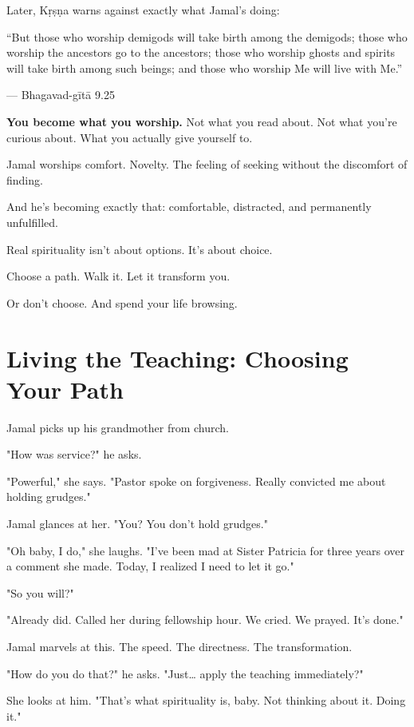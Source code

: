 \documentclass[11pt,twoside]{book}
\begin{document}
Later, Kṛṣṇa warns against exactly what Jamal's doing:

\begin{pullquote}
``But those who worship demigods will take birth among the demigods; those who worship the ancestors go to the ancestors; those who worship ghosts and spirits will take birth among such beings; and those who worship Me will live with Me.''

--- Bhagavad-gītā 9.25
\end{pullquote}

\textbf{\textbf{You become what you worship.}} Not what you read about. Not what you're curious about. What you actually give yourself to.

Jamal worships comfort. Novelty. The feeling of seeking without the discomfort of finding.

And he's becoming exactly that: comfortable, distracted, and permanently unfulfilled.

Real spirituality isn't about options. It's about choice.

Choose a path. Walk it. Let it transform you.

Or don't choose. And spend your life browsing.

\section*{Living the Teaching: Choosing Your Path}

Jamal picks up his grandmother from church.

"How was service?" he asks.

"Powerful," she says. "Pastor spoke on forgiveness. Really convicted me about holding grudges."

Jamal glances at her. "You? You don't hold grudges."

"Oh baby, I do," she laughs. "I've been mad at Sister Patricia for three years over a comment she made. Today, I realized I need to let it go."

"So you will?"

"Already did. Called her during fellowship hour. We cried. We prayed. It's done."

Jamal marvels at this. The speed. The directness. The transformation.

"How do you do that?" he asks. "Just\ldots{} apply the teaching immediately?"

She looks at him. "That's what spirituality is, baby. Not thinking about it. Doing it."
\end{document}
